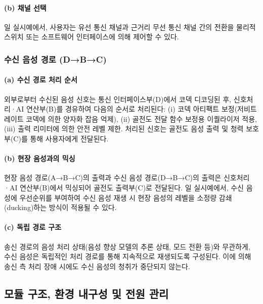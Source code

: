 \documentclass{article}
\begin{document}
\paragraph{(b) 채널 선택}

일 실시예에서, 사용자는 유선 통신 채널과 근거리 무선 통신 채널 간의 전환을 물리적 스위치 또는 소프트웨어 인터페이스에 의해 제어할 수 있다.

\subsubsection{수신 음성 경로 (D→B→C)}

\paragraph{(a) 수신 경로 처리 순서}

외부로부터 수신된 음성 신호는 통신 인터페이스부(D)에서 코덱 디코딩된 후, 신호처리·AI 연산부(B)를 경유하여 다음의 순서로 처리된다: (i) 코덱 아티팩트 보정(저비트레이트 코덱에 의한 양자화 잡음 억제), (ii) 골전도 전달 함수 보정용 이퀄라이저 적용, (iii) 출력 리미터에 의한 안전 레벨 제한. 처리된 신호는 골전도 음성 출력 및 청력 보호부(C)를 통해 사용자에게 전달된다.

\paragraph{(b) 현장 음성과의 믹싱}

현장 음성 경로(A→B→C)의 출력과 수신 음성 경로(D→B→C)의 출력은 신호처리·AI 연산부(B)에서 믹싱되어 골전도 출력부(C)로 전달된다. 일 실시예에서, 수신 음성에 우선순위를 부여하여 수신 음성 재생 시 현장 음성의 레벨을 소정량 감쇄(ducking)하는 방식이 적용될 수 있다.

\paragraph{(c) 독립 경로 구조}

송신 경로의 음성 처리 상태(음성 향상 모델의 추론 상태, 모드 전환 등)와 무관하게, 수신 음성은 독립적인 처리 경로를 통해 지속적으로 재생되도록 구성된다. 이에 의해 송신 측 처리 장애 시에도 수신 음성의 청취가 중단되지 않는다.

\subsection{모듈 구조, 환경 내구성 및 전원 관리}
\end{document}
